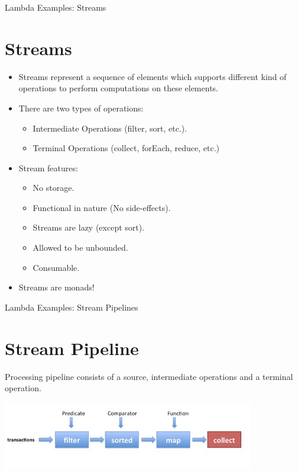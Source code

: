 \documentclass{beamer}
\begin{document}
	\begin{frame}[fragile]{Lambda Examples: Streams}
		\section{Streams}
		
			\begin{itemize}
				\item Streams represent a sequence of elements which supports different kind of operations to perform computations on these elements. 
				\item There are two types of operations:
				\begin{itemize}
					\item Intermediate Operations (filter, sort, etc.). 
					\item Terminal Operations (collect, forEach, reduce, etc.)
				\end{itemize}

				\item Stream features:
				\begin{itemize}
				\item No storage. 
				\item Functional in nature (No side-effects).
				\item Streams are lazy (except sort).
				\item Allowed to be unbounded.
				\item Consumable.
				\end{itemize}
				\item Streams are monads!
			\end{itemize}

	\end{frame}	

	\begin{frame}[fragile]{Lambda Examples: Stream Pipelines}
		\section{Stream Pipeline}
		
		Processing pipeline consists of a source, intermediate operations and a terminal operation.
		
		\includegraphics[width=11cm]{pipeline}	
		
	\end{frame}	
\end{document}
